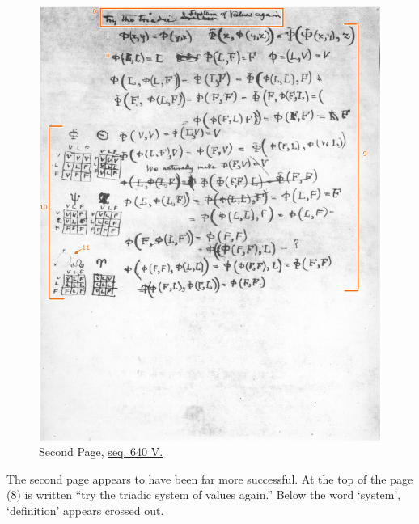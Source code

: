 \begin{figure}
    \centering
    \includegraphics[width=\textwidth]{images/page two.jpeg}
    \caption{Second Page, \href{https://iiif.lib.harvard.edu/manifests/view/drs:15255301$640i}{seq. 640 V.}}
    \label{fig:640}
\end{figure}

The second page appears to have been far more successful. At the top of the page (8) is written ``try the triadic system of values again.'' Below the word `system', `definition' appears crossed out.

